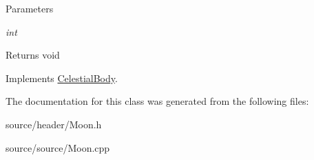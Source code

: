 \begin{DoxyParams}{Parameters}
\item[{\em int}]\end{DoxyParams}
\begin{DoxyReturn}{Returns}
void 
\end{DoxyReturn}


Implements \hyperlink{classCelestialBody}{CelestialBody}.



The documentation for this class was generated from the following files:\begin{DoxyCompactItemize}
\item 
source/header/Moon.h\item 
source/source/Moon.cpp\end{DoxyCompactItemize}
